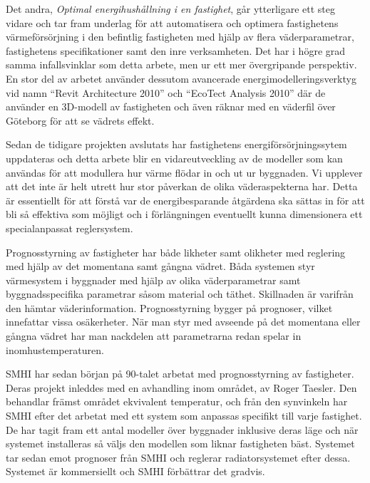 Det andra, \textit{Optimal energihushållning i en fastighet}\cite{kandidatarbete2010},
går ytterligare ett steg vidare och tar fram underlag för att automatisera och
optimera fastighetens värmeförsörjning i den befintlig fastigheten med hjälp av
flera väderparametrar, fastighetens specifikationer samt den inre verksamheten. Det har i högre grad samma infallsvinklar som detta arbete, men ur ett mer övergripande perspektiv. En stor del av arbetet använder dessutom avancerade
energimodelleringsverktyg vid namn ``Revit Architecture 2010'' och 
``EcoTect Analysis 2010'' där de använder en 3D-modell av fastigheten och även
räknar med en väderfil över Göteborg för att se vädrets effekt.

Sedan de tidigare projekten avslutats har fastighetens energiförsörjningssytem uppdateras och detta arbete blir en vidareutveckling av de modeller som kan användas för att modullera hur värme flödar in och ut ur byggnaden. Vi upplever att det inte är helt utrett hur stor påverkan de olika väderaspekterna har. Detta är essentiellt för att förstå var de energibesparande åtgärdena ska sättas in för att bli så effektiva som möjligt och i förlängningen eventuellt kunna dimensionera ett specialanpassat reglersystem.

Prognosstyrning av fastigheter har både likheter samt olikheter med reglering med hjälp av det momentana samt gångna vädret. Båda systemen styr värmesystem i byggnader med hjälp av olika väderparametrar samt byggnadsspecifika parametrar såsom material och täthet. Skillnaden är varifrån den hämtar väderinformation. Prognosstyrning bygger på prognoser, vilket innefattar vissa osäkerheter. När man styr med avseende på det momentana eller gångna vädret har man nackdelen att parametrarna redan spelar in inomhustemperaturen.

SMHI har sedan början på 90-talet arbetat med prognosstyrning av fastigheter. Deras projekt inleddes med en avhandling inom området, av Roger Taesler. Den behandlar främst området ekvivalent temperatur, och från den synvinkeln har SMHI efter det arbetat med ett system som anpassas specifikt till varje fastighet. De har tagit fram ett antal modeller över byggnader inklusive deras läge och när systemet installeras så väljs den modellen som liknar fastigheten bäst. Systemet tar sedan emot prognoser från SMHI och reglerar radiatorsystemet efter dessa. Systemet är kommersiellt och SMHI förbättrar det gradvis.






